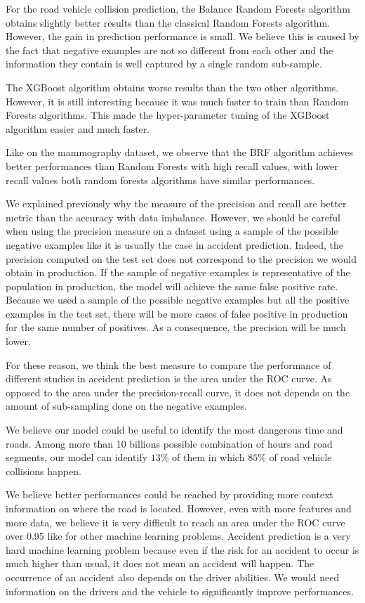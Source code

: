 \documentclass[conference]{IEEEtran}
\begin{document}
For the road vehicle collision prediction, the Balance Random Forests algorithm obtains slightly better results than the classical Random Forests algorithm. However, the gain in prediction performance is small. We believe this is caused by the fact that negative examples are not so different from each other and the information they contain is well captured by a single random sub-sample. 

The XGBoost algorithm obtains worse results than the two other algorithms. However, it is still interesting because it was much faster to train than Random Forests algorithms. This made the hyper-parameter tuning of the XGBoost algorithm easier and much faster. 

Like on the mammography dataset, we observe that the BRF algorithm achieves better performances than Random Forests with high recall values, with lower recall values both random forests algorithms have similar performances.

We explained previously why the measure of the precision and recall are better metric than the accuracy with data imbalance. However, we should be careful when using the precision measure on a dataset using a sample of the possible negative examples like it is usually the case in accident prediction. Indeed, the precision computed on the test set does not correspond to the precision we would obtain in production.
If the sample of negative examples is representative of the population
in production, the model will achieve the same false positive rate.
Because we used a sample of the possible negative examples but all the 
positive examples in the test set, there will be more cases of false positive in production for the same number of positives. As a consequence, the precision will be much lower.

For these reason, we think the best measure to compare the performance of
different studies in accident prediction is the area under the ROC curve.
As opposed to the area under the precision-recall curve, it does not depends on the amount of sub-sampling done on the negative examples. 

We believe our model could be useful to identify the most dangerous
time and roads. Among more than 10 billions possible combination of
hours and road segments, our model can identify $13\%$ of them in which
$85\%$ of road vehicle collisions happen.

We believe better performances could be reached by providing more
context information on where the road is located. However, even with more
features and more data, we believe it is very difficult to reach an area under
the ROC curve over 0.95 like for other machine learning problems. Accident prediction is a very hard machine learning problem 
because even if the risk for an accident to occur is much higher than usual, it 
does not mean an accident will happen. The occurrence of an accident also depends 
on the driver abilities. We would need information on the drivers and the vehicle
to significantly improve performances.
\end{document}
